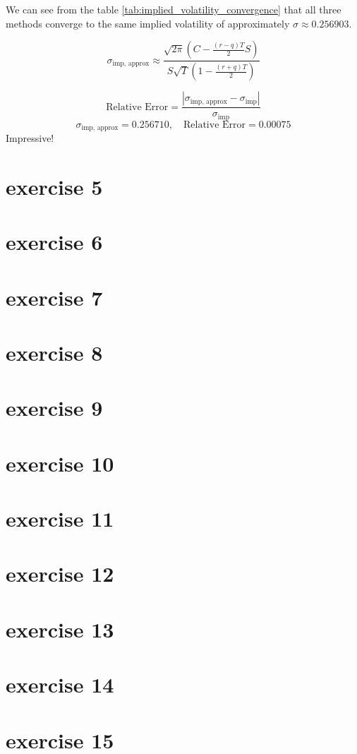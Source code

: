 \documentclass{article}
\begin{document}
We can see from the table \ref{tab:implied_volatility_convergence} that all three methods converge to the same implied volatility of approximately \( \sigma \approx 0.256903 \).

\[
    \sigma_{\text{imp, approx}} \approx
    \frac{ \sqrt{2\pi} \left( C - \frac{(r - q)T}{2} S \right) }
    { S \sqrt{T} \left( 1 - \frac{(r + q)T}{2} \right) }
\]

\[
    \text{Relative Error} =
    \frac{ \left| \sigma_{\text{imp, approx}} - \sigma_{\text{imp}} \right| }
    { \sigma_{\text{imp}} }
\]
\[
    \sigma_{\text{imp, approx}} = 0.256710, \quad
    \text{Relative Error} = 0.00075
\]
Impressive!

\section{exercise 5}
\section{exercise 6}
\section{exercise 7}
\section{exercise 8}
\section{exercise 9}
\section{exercise 10}
\section{exercise 11}
\section{exercise 12}
\section{exercise 13}
\section{exercise 14}
\section{exercise 15}
\end{document}
